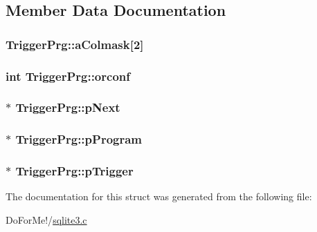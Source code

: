 \subsection{Member Data Documentation}
\hypertarget{struct_trigger_prg_aeac0a4cd1f1d287981ae33c4d171b614}{
\subsubsection[{a\-Colmask}]{ Trigger\-Prg\-::a\-Colmask\mbox{[}2\mbox{]}}}\label{struct_trigger_prg_aeac0a4cd1f1d287981ae33c4d171b614}
\hypertarget{struct_trigger_prg_aa475acda58c472b3491f6aa17020bf68}{
\subsubsection[{orconf}]{\setlength{\rightskip}{0pt plus 5cm}int Trigger\-Prg\-::orconf}}\label{struct_trigger_prg_aa475acda58c472b3491f6aa17020bf68}
\hypertarget{struct_trigger_prg_a551b8a29a8c4ff785afab1596e5d8710}{
\subsubsection[{p\-Next}]{$\ast$ Trigger\-Prg\-::p\-Next}}\label{struct_trigger_prg_a551b8a29a8c4ff785afab1596e5d8710}
\hypertarget{struct_trigger_prg_aa770aee270c7c5df85578dc4a6686134}{
\subsubsection[{p\-Program}]{$\ast$ Trigger\-Prg\-::p\-Program}}\label{struct_trigger_prg_aa770aee270c7c5df85578dc4a6686134}
\hypertarget{struct_trigger_prg_af70e5a74c954bc7a1eb8ee1162c40368}{
\subsubsection[{p\-Trigger}]{$\ast$ Trigger\-Prg\-::p\-Trigger}}\label{struct_trigger_prg_af70e5a74c954bc7a1eb8ee1162c40368}


The documentation for this struct was generated from the following file\-:\begin{DoxyCompactItemize}
\item 
Do\-For\-Me!/\hyperlink{sqlite3_8c}{sqlite3.\-c}\end{DoxyCompactItemize}
